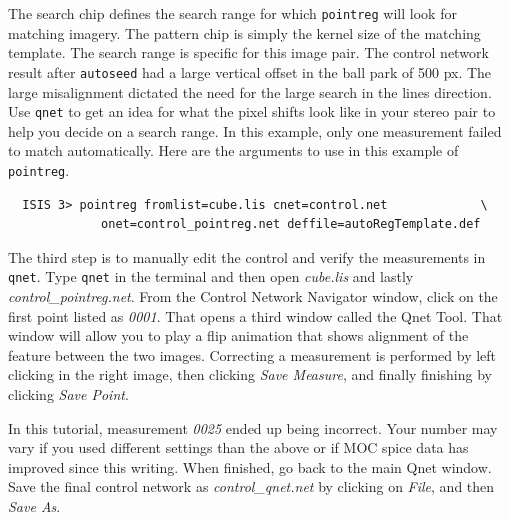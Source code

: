 The search chip defines the search range for which \texttt{pointreg}
will look for matching imagery. The pattern chip is simply the kernel
size of the matching template. The search range is specific for this
image pair. The control network result after \texttt{autoseed} had a
large vertical offset in the ball park of 500 px. The large
misalignment dictated the need for the large search in the lines
direction. Use \texttt{qnet} to get an idea for what the pixel shifts
look like in your stereo pair to help you decide on a search range. In
this example, only one measurement failed to match automatically. Here
are the arguments to use in this example of \texttt{pointreg}.

\begin{verbatim}
  ISIS 3> pointreg fromlist=cube.lis cnet=control.net             \
             onet=control_pointreg.net deffile=autoRegTemplate.def
\end{verbatim}

The third step is to manually edit the control and verify the
measurements in \texttt{qnet}. Type \texttt{qnet} in the terminal and
then open \textit{cube.lis} and lastly
\textit{control\_pointreg.net}. From the Control Network Navigator
window, click on the first point listed as \textit{0001}. That opens a
third window called the Qnet Tool. That window will allow you to play
a flip animation that shows alignment of the feature between the two
images. Correcting a measurement is performed by left clicking in the
right image, then clicking \textit{Save Measure}, and finally
finishing by clicking \textit{Save Point}.

In this tutorial, measurement \textit{0025} ended up being
incorrect. Your number may vary if you used different settings than
the above or if MOC spice data has improved since this writing. When
finished, go back to the main Qnet window. Save the final control
network as \textit{control\_qnet.net} by clicking on \textit{File},
and then \textit{Save As}.

